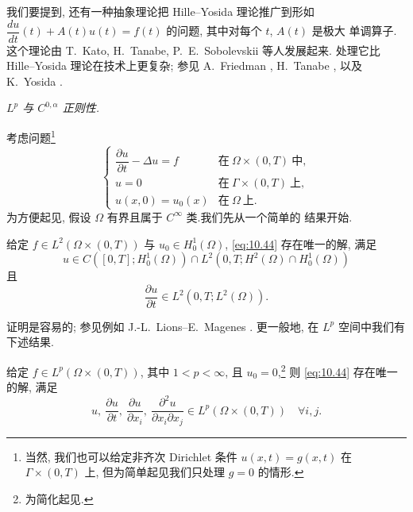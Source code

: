 我们要提到, 还有一种抽象理论把 Hille--Yosida 理论推广到形如
$\dfrac{du}{dt}(t)+A(t)u(t)=f(t)$ 的问题, 其中对每个 $t$, $A(t)$ 是极大
单调算子.这个理论由 T.~Kato, H.~Tanabe, P.~E.~Sobolevskii 等人发展起来.
处理它比 Hille--Yosida 理论在技术上更复杂; 参见
A.~Friedman , H.~Tanabe , 以及
K.~Yosida .

 \emph{$L^p$ 与 $C^{0,\alpha}$ 正则性.}

考虑问题\footnote{当然, 我们也可以给定非齐次 Dirichlet 条件
$u(x,t)=g(x,t)$ 在 $\Gamma\times(0,T)$ 上, 但为简单起见我们只处理
$g=0$ 的情形.}
\begin{equation}
\begin{cases}
\dfrac{\partial u}{\partial t}-\Delta u=f & \text{在}\
\Omega\times(0,T)\ \text{中},\\[2mm]
u=0 & \text{在}\ \Gamma\times(0,T)\ \text{上},\\
u(x,0)=u_0(x) & \text{在}\ \Omega\ \text{上}.
\end{cases}
\label{eq:10.44}
\end{equation}
为方便起见, 假设 $\Omega$ 有界且属于 $C^\infty$ 类.我们先从一个简单的
结果开始.

\begin{theorem}[$L^2$ 正则性]
\label{thm:10.11}
给定 $f\in L^2(\Omega\times(0,T))$ 与 $u_0\in H_0^1(\Omega)$, \eqref{eq:10.44}
存在唯一的解, 满足
\begin{equation*}
u\in C([0,T];H_0^1(\Omega))\cap L^2(0,T;H^2(\Omega)\cap H_0^1(\Omega))
\end{equation*}
且
\begin{equation*}
\frac{\partial u}{\partial t}\in L^2(0,T;L^2(\Omega)).
\end{equation*}
\end{theorem}

证明是容易的; 参见例如 J.-L.~Lions--E.~Magenes .
更一般地, 在 $L^p$ 空间中我们有下述结果.

\begin{theorem}[$L^p$ 正则性]
\label{thm:10.12}
给定 $f\in L^p(\Omega\times(0,T))$, 其中 $1<p<\infty$, 且
$u_0=0$,\footnote{为简化起见.} 则 \eqref{eq:10.44} 存在唯一的解, 满足
\begin{equation*}
u,\ \frac{\partial u}{\partial t},\
\frac{\partial u}{\partial x_i},\
\frac{\partial^2u}{\partial x_i\partial x_j}
\in L^p(\Omega\times(0,T))\quad\forall i,j.
\end{equation*}
\end{theorem}

